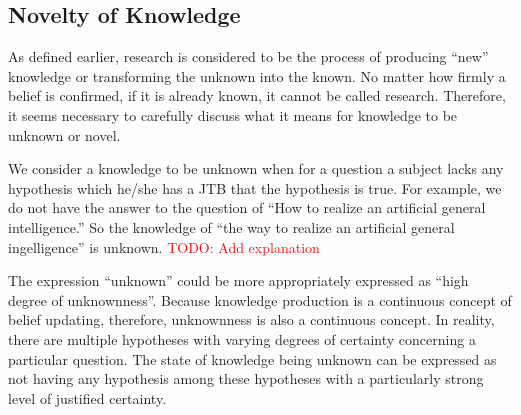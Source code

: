 \documentclass{book}
\begin{document}
\subsection{Novelty of Knowledge}
As defined earlier, research is considered to be the process of producing ``new'' knowledge or transforming the unknown into the known. No matter how firmly a belief is confirmed, if it is already known, it cannot be called research. Therefore, it seems necessary to carefully discuss what it means for knowledge to be unknown or novel.


We consider a knowledge to be unknown when for a question a subject lacks any hypothesis which he/she has a JTB that the hypothesis is true. For example, we do not have the answer to the question of ``How to realize an artificial general intelligence.'' So the knowledge of ``the way to realize an artificial general ingelligence'' is unknown. \textcolor{red}{TODO: Add explanation}

The expression ``unknown'' could be more appropriately expressed as ``high degree of unknownness''. Because knowledge production is a continuous concept of belief updating, therefore, unknownness is also a continuous concept. In reality, there are multiple hypotheses with varying degrees of certainty concerning a particular question. The state of knowledge being unknown can be expressed as not having any hypothesis among these hypotheses with a particularly strong level of justified certainty.

\end{document}
